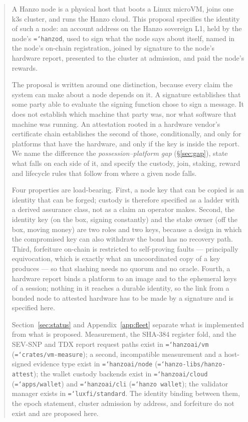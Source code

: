 \documentclass[11pt,a4paper]{article}
\newcommand{\code}[1]{\texttt{\hyphenchar\font=`\-\relax #1}}
\begin{document}
\begin{abstract}
\noindent
A Hanzo node is a physical host that boots a Linux microVM, joins one k3s
cluster, and runs the Hanzo cloud. This proposal specifies the identity of such
a node: an account address on the Hanzo sovereign L1, held by the node's
\code{hanzod}, used to sign what the node says about itself, named in the node's
on-chain registration, joined by signature to the node's hardware report,
presented to the cluster at admission, and paid the node's rewards.

The proposal is written around one distinction, because every claim the system
can make about a node depends on it. A signature establishes that some party
able to evaluate the signing function chose to sign a message. It does not
establish which machine that party was, nor what software that machine was
running. An attestation rooted in a hardware vendor's certificate chain
establishes the second of those, conditionally, and only for platforms that have
the hardware, and only if the key is inside the report. We name the difference
the \emph{possession--platform gap} (\S\ref{sec:gap}), state what falls on each
side of it, and specify the custody, join, staking, reward and lifecycle rules
that follow from where a given node falls.

Four properties are load-bearing. First, a node key that can be copied is an
identity that can be forged; custody is therefore specified as a ladder with a
derived assurance class, not as a claim an operator makes. Second, the identity
key (on the box, signing constantly) and the stake owner (off the box, moving
money) are two roles and two keys, because a design in which the compromised key
can also withdraw the bond has no recovery path. Third, forfeiture on-chain is
restricted to self-proving faults --- principally equivocation, which is exactly
what an uncoordinated copy of a key produces --- so that slashing needs no quorum
and no oracle. Fourth, a hardware report binds a platform to an image and to the
ephemeral keys of a session; nothing in it reaches a durable identity, so the link
from a bonded node to attested hardware has to be made by a signature and is
specified here.

Section~\ref{sec:status} and Appendix~\ref{app:fleet} separate what is
implemented from what is proposed. Measurement, the SHA-384 register fold, and
the SEV-SNP and TDX report request paths exist in \code{hanzoai/vm}
(\code{crates/vm-measure}); a second, incompatible measurement and a host-signed
evidence type exist in \code{hanzoai/node} (\code{hanzo-libs/hanzo-attest}); the
wallet custody backends exist in \code{hanzoai/cloud} (\code{apps/wallet}) and
\code{hanzoai/cli} (\code{hanzo wallet}); the validator manager exists in
\code{luxfi/standard}. The identity binding between them, the epoch statement,
cluster admission by address, and forfeiture do not exist and are proposed here.
\end{abstract}
\end{document}
